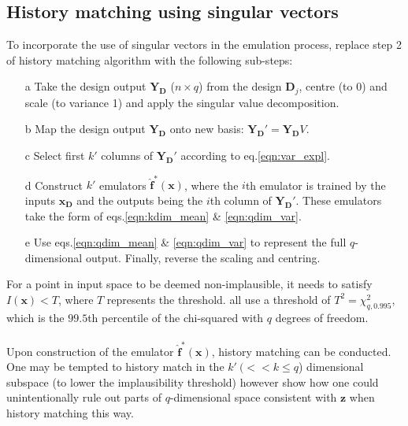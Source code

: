 \documentclass{article}
\newcommand{\numOutputs}{q}
\newcommand{\emulator}{\hat{f}}
\newcommand{\inputVec}{\mathbf{x}}
\newcommand{\outputVec}{\mathbf{y}}
\newcommand{\designInput}{\inputVec_\design}
\newcommand{\designOutput}{\outputVec_\design}
\newcommand{\design}{\mathbf{D}}
\newcommand{\obsqD}{\mathbf{z}}
\newcommand{\impl}{I}
\newcommand{\numDPs}{n}
\newcommand{\RSingVecs}{V}
\newcommand{\matRank}{k}
\newcommand{\thresh}{T}
\newcommand{\outputMat}{\mathbf{Y}_\design}%
\begin{document}
\subsection{History matching using singular vectors}
\label{hm-singVec}
To incorporate the use of singular vectors in the emulation process, replace step 2 of history matching algorithm with the following sub-steps:
\begin{enumerate}
    \item[a] Take the design output $\outputMat$ ($\numDPs \times \numOutputs$) from the design $\design_j$, centre (to 0) and scale (to variance 1) and apply the singular value decomposition.

    \item[b] Map the design output $\outputMat$ onto new basis: $\outputMat' = \outputMat \RSingVecs$.

    \item[c] Select first $\matRank'$ columns of $\outputMat'$ according to eq.\eqref{eqn:var_expl}.
    
    \item[d] Construct $\matRank'$ emulators $\mathbf{\emulator^*}(\inputVec)$, where the $i$th emulator is trained by the inputs $\designInput$ and the outputs being the $i$th column of $\outputMat'$. These emulators take the form of eqs.\eqref{eqn:kdim_mean} \& \eqref{eqn:qdim_var}.
    
    \item[e] Use eqs.\eqref{eqn:qdim_mean} \& \eqref{eqn:qdim_var} to represent the full $\numOutputs$-dimensional output. Finally, reverse the scaling and centring.
\end{enumerate}
For a point in input space to be deemed non-implausible, it needs to satisfy $\impl(\inputVec) < \thresh$, where $\thresh$ represents the threshold. \citet{Vernon2010,Andrianakis2015,Salter2019} all use a threshold of $\thresh^2 = \chi_{\numOutputs,0.995}^2$, which is the $99.5$th percentile of the chi-squared with $\numOutputs$ degrees of freedom.\\\\
Upon construction of the emulator $\mathbf{\emulator}^*(\inputVec)$, history matching can be conducted. One may be tempted to history match in the $\matRank' \ (<< \matRank \leq \numOutputs$) dimensional subspace (to lower the implausibility threshold) however \citet{Salter2019} show how one could unintentionally rule out parts of $\numOutputs$-dimensional space consistent with $\obsqD$ when history matching this way.\\\\
\end{document}
